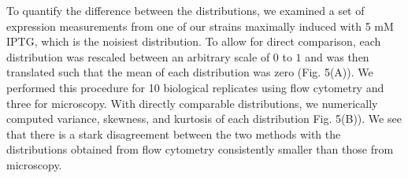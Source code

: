 \documentclass[letterpaper, 10pt]{article}
\begin{document}
\begin{figure}[ht]
  \label{fig:iptg_distributions}
\end{figure}

To quantify the difference between the distributions, we examined a set of
expression measurements from one of our strains maximally induced with 5 mM IPTG,
which is the noisiest distribution. To allow for direct comparison, each distribution
was rescaled between an arbitrary scale of $0$ to $1$ and was then translated
such that the mean of each distribution was zero (Fig. 5(A)). We performed this
procedure for 10 biological replicates using flow cytometry and three for
microscopy. With directly comparable distributions, we numerically computed
variance, skewness, and kurtosis of each distribution Fig. 5(B)). We see that
there is a stark disagreement between the two methods with the distributions
obtained from flow cytometry consistently smaller than those from microscopy.
\end{document}
